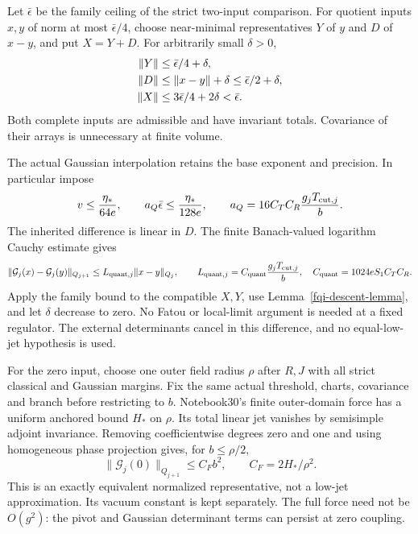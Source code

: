 Let $\bar\epsilon$ be the family ceiling of the strict two-input
comparison. For quotient inputs $x,y$ of norm at most
$\bar\epsilon/4$, choose near-minimal representatives $Y$ of $y$
and $D$ of $x-y$, and put $X=Y+D$. For arbitrarily small
$\delta>0$,
\begin{align}
 \|Y\|&\le\bar\epsilon/4+\delta,\notag\\
 \|D\|&\le\|x-y\|+\delta\le\bar\epsilon/2+\delta,\notag\\
 \|X\|&\le3\bar\epsilon/4+2\delta<\bar\epsilon.
 \label{fqi-compatible-representatives}
\end{align}
Both complete inputs are admissible and have invariant totals.
Covariance of their arrays is unnecessary at finite volume.

The actual Gaussian interpolation retains the base exponent and
precision. In particular impose
\begin{equation}
 v\le\frac{\eta_*}{64e},\qquad
 a_Q\bar\epsilon\le\frac{\eta_*}{128e},\qquad
 a_Q=16C_TC_R\frac{g_jT_{{\rm cut},j}}b.
 \label{fqi-comparison-budgets}
\end{equation}
The inherited difference is linear in $D$. The finite
Banach-valued logarithm Cauchy estimate gives
\begin{equation}
 \|\mathcal G_j(x)-\mathcal G_j(y)\|_{Q_{j+1}}
 \le L_{\mathrm{quant},j}\|x-y\|_{Q_j},\qquad
 L_{\mathrm{quant},j}
   =C_{\mathrm{quant}}\frac{g_jT_{{\rm cut},j}}b,\quad
 C_{\mathrm{quant}}=1024eS_1C_TC_R.
 \label{fqi-quantum-Lipschitz}
\end{equation}
Apply the family bound to the compatible $X,Y$, use
Lemma~\ref{fqi-descent-lemma}, and let $\delta$ decrease to zero.
No Fatou or local-limit argument is needed at a fixed regulator.
The external determinants cancel in this difference, and no
equal-low-jet hypothesis is used.

For the zero input, choose one outer field radius $\rho$ after
$R,J$ with all strict classical and Gaussian margins. Fix the
same actual threshold, charts, covariance and branch before
restricting to $b$. Notebook30's finite outer-domain force has
a uniform anchored bound $H_*$ on $\rho$. Its total linear
jet vanishes by semisimple adjoint invariance. Removing
coefficientwise degrees zero and one and using homogeneous
phase projection gives, for $b\le\rho/2$,
\begin{equation}
 \|\mathcal G_j(0)\|_{Q_{j+1}}\le C_Fb^2,
 \qquad C_F=2H_*/\rho^2.
 \label{fqi-force}
\end{equation}
This is an exactly equivalent normalized representative, not
a low-jet approximation. Its vacuum constant is kept separately.
The full force need not be $O(g^2)$: the pivot and Gaussian
determinant terms can persist at zero coupling.

